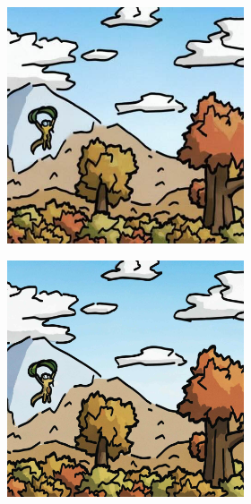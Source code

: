 \documentclass{article}
\begin{document}
\begin{figure}[h]
\begin{subfigure}[t]{\textwidth}
\begin{subfigure}[b]{0.24\textwidth}
     \end{subfigure}
     \hfill
     \begin{subfigure}[b]{0.24\textwidth}
         \centering
         \includegraphics[width=\textwidth]{plots/process/preprocess/mist/diffpure.jpg}
     \end{subfigure}
     \hfill
     \begin{subfigure}[b]{0.24\textwidth}
         \centering
         \includegraphics[width=\textwidth]{plots/process/preprocess/mist/upscale.jpg}

\end{subfigure}
\end{subfigure}
\end{figure}
\end{document}
